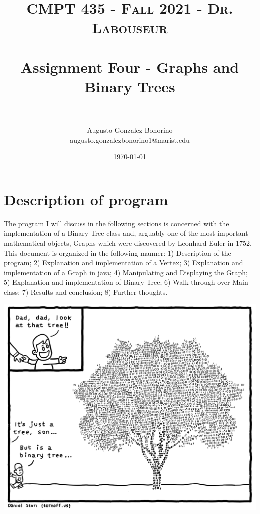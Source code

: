 \documentclass[letterpaper, 10pt]{article}
\title{	
   \normalfont \normalsize 
   \textsc{CMPT 435 - Fall 2021 - Dr. Labouseur} \\[10pt] %
   \horrule{0.5pt} \\[0.25cm] 	%
   \huge Assignment Four - Graphs and Binary Trees \\     	    %
   \horrule{0.5pt} \\[0.25cm] 	%
}
\author{Augusto Gonzalez-Bonorino \\ \normalsize augusto.gonzalezbonorino1@marist.edu}
\date{\normalsize\today} 	%
\begin{document}
\maketitle %



\section{Description of program}

The program I will discuss in the following sections is concerned with the implementation of a Binary Tree class and, arguably one of the most important mathematical objects, Graphs which were discovered by Leonhard Euler in 1752. This document is organized in the following manner: 1) Description of the program; 2) Explanation and implementation of a Vertex; 3) Explanation and implementation of a Graph in java; 4) Manipulating and Displaying the Graph; 5) Explanation and implementation of Binary Tree; 6) Walk-through over Main class; 7) Results and conclusion; 8) Further thoughts.
\begin{center}
    \includegraphics[scale=0.18]{images/binary-tree.png}
\end{center}
\\
\end{document}

